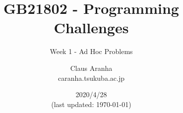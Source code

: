 \documentclass{beamer}
\title[GB21802]{GB21802 - Programming Challenges}
\subtitle[]{Week 1 - Ad Hoc Problems}
\author[Claus Aranha]{Claus Aranha\\{\footnotesize caranha\@@cs.tsukuba.ac.jp}}
\institute{Department of Computer Science}
\date{2020/4/28\\{\smaller(last updated: \today)}}
\begin{document}
\begin{frame}
\maketitle
\end{frame}




\end{document}
